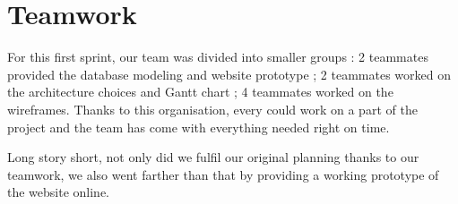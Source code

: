 \section{Teamwork}

For this first sprint, our team was divided into smaller groups : 2
teammates provided the database modeling and website prototype ; 2 teammates
worked on the architecture choices and Gantt chart ; 4 teammates worked on
the wireframes. Thanks to this organisation, every could work on a part of
the project and the team has come with everything needed right on time.\newline

Long story short, not only did we fulfil our original planning thanks to our
teamwork, we also went farther than that by providing a working prototype
of the website online.
